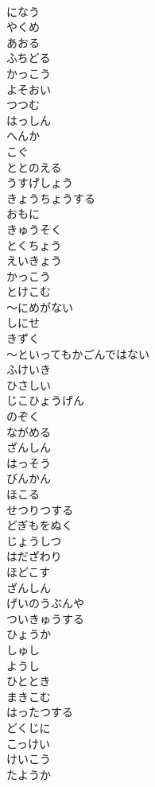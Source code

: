 \documentclass[8pt]{extreport}
\begin{document}
\begin{CJK}{UTF8}{min}
\\	になう
\\	やくめ
\\	あおる
\\	ふちどる
\\	かっこう
\\	よそおい
\\	つつむ
\\	はっしん
\\	へんか
\\	こぐ
\\	ととのえる
\\	うすげしょう
\\	きょうちょうする
\\	おもに
\\	きゅうそく
\\	とくちょう
\\	えいきょう
\\	かっこう
\\	とけこむ
\\	～にめがない
\\	しにせ
\\	きずく
\\	～といってもかごんではない
\\	ふけいき
\\	ひさしい
\\	じこひょうげん
\\	のぞく
\\	ながめる
\\	ざんしん
\\	はっそう
\\	びんかん
\\	ほこる
\\	せつりつする
\\	どぎもをぬく
\\	じょうしつ
\\	はだざわり
\\	ほどこす
\\	ざんしん
\\	げいのうぶんや
\\	ついきゅうする
\\	ひょうか
\\	しゅし
\\	ようし
\\	ひととき
\\	まきこむ
\\	はったつする
\\	どくじに
\\	こっけい
\\	けいこう
\\	たようか

\end{CJK}
\end{document}

